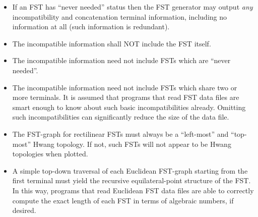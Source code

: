 \documentclass[12pt,twoside,letterpaper]{article}
\begin{document}
\begin{itemize}
\item
  If an FST has ``never needed'' status then the FST generator may output
  {\em any} incompatibility and concatenation terminal information, including
  no information at all (such information is redundant).

\item
  The incompatible information shall NOT include the FST itself.

\item
  The incompatible information need not include FSTs which are ``never
  needed''.

\item 
  The incompatible information need not include FSTs which share two or
  more terminals.  It is assumed that programs that read FST data files
  are smart enough to know about such basic incompatibilities already.
  Omitting such incompatibilities can significantly reduce the size of
  the data file.

\item
  The FST-graph for rectilinear FSTs must always be a ``left-most'' and
  ``top-most'' Hwang topology.  If not, such FSTs will not appear to be
  Hwang topologies when plotted.

\item
  A simple top-down traversal of each Euclidean FST-graph starting from
  the first terminal must yield the recursive equilateral-point
  structure of the FST.  In this way, programs that read Euclidean FST
  data files are able to correctly compute the exact length of each FST
  in terms of algebraic numbers, if desired.
\end{itemize}

\printindex
\end{document}
